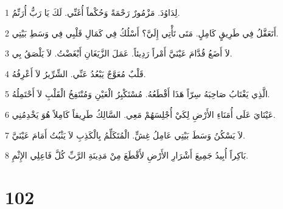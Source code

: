 \par 1 لِدَاوُدَ. مَزْمُورٌ رَحْمَةً وَحُكْماً أُغَنِّي. لَكَ يَا رَبُّ أُرَنِّمُ.
\par 2 أَتَعَقَّلُ فِي طَرِيقٍ كَامِلٍ. مَتَى تَأْتِي إِلَيَّ؟ أَسْلُكُ فِي كَمَالِ قَلْبِي فِي وَسَطِ بَيْتِي.
\par 3 لاَ أَضَعُ قُدَّامَ عَيْنَيَّ أَمْراً رَدِيئاً. عَمَلَ الزَّيَغَانِ أَبْغَضْتُ. لاَ يَلْصَقُ بِي.
\par 4 قَلْبٌ مُعَوَّجٌ يَبْعُدُ عَنِّي. الشِّرِّيرُ لاَ أَعْرِفُهُ.
\par 5 الَّذِي يَغْتَابُ صَاحِبَهُ سِرّاً هَذَا أَقْطَعُهُ. مُسْتَكْبِرُ الْعَيْنِ وَمُنْتَفِخُ الْقَلْبِ لاَ أَحْتَمِلُهُ.
\par 6 عَيْنَايَ عَلَى أُمَنَاءِ الأَرْضِ لِكَيْ أُجْلِسَهُمْ مَعِي. السَّالِكُ طَرِيقاً كَامِلاً هُوَ يَخْدِمُنِي.
\par 7 لاَ يَسْكُنُ وَسَطَ بَيْتِي عَامِلُ غِشٍّ. الْمُتَكَلِّمُ بِالْكَذِبِ لاَ يَثْبُتُ أَمَامَ عَيْنَيَّ.
\par 8 بَاكِراً أُبِيدُ جَمِيعَ أَشْرَارِ الأَرْضِ لأَقْطَعَ مِنْ مَدِينَةِ الرَّبِّ كُلَّ فَاعِلِي الإِثْمِ.

\chapter{102}

